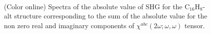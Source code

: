 \documentclass[pss]{wiley2sp} %
\begin{document}
\begin{figure}[t]
\\
\caption{(Color online) Spectra of the absolute value of SHG for the
    C$_{16}$H$_{8}$-alt structure corresponding to the
    sum of the absolute value for the non zero real and imaginary components
    of $\chi^{abc}(2\omega;\omega,
    \omega) $ tensor.\label{fig:alt-shg-abs}}
\end{figure}
\end{document}
